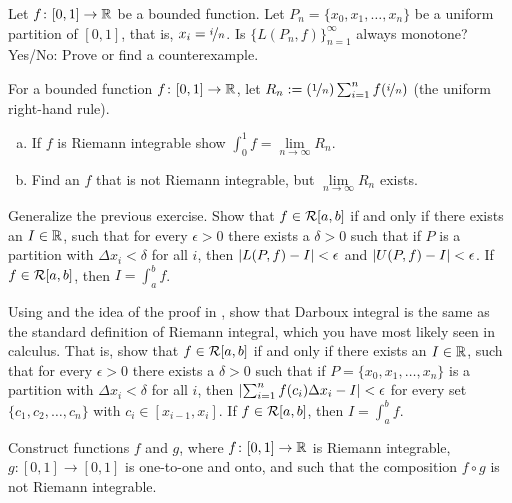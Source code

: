 \begin{exercise}
Let $f \colon [0,1] \to {\mathbb{R}}$ be a bounded function.
Let $P_n = \{ x_0,x_1,\ldots,x_n \}$ be a uniform partition of $[0,1]$,
that is, $x_i = \nicefrac{i}{n}$.  Is $\bigl\{ L(P_n,f) \bigr\}_{n=1}^\infty$
always monotone?  Yes/No: Prove or find a counterexample.
\end{exercise}

\begin{exercise}[Challenging]
For a bounded function $f \colon [0,1] \to {\mathbb{R}}$, let
$R_n := (\nicefrac{1}{n})\sum_{i=1}^n f(\nicefrac{i}{n})$ (the
uniform right-hand rule).
\begin{enumerate}[a)]
\item
If $f$ is Riemann integrable show $\int_0^1 f = \lim\limits_{n\to\infty} R_n$.
\item
Find an $f$ that is not Riemann integrable, but $\lim\limits_{n\to\infty} R_n$ exists.
\end{enumerate}
\end{exercise}

\begin{exercise}[Challenging] \label{exercise:riemannintdarboux}
Generalize the previous exercise.
Show that $f \in {\mathcal{R}}[a,b]$ if and only if there exists an $I \in {\mathbb{R}}$,
such that for every $\epsilon > 0$ there exists
a $\delta > 0$ such that if $P$ is a partition with $\Delta x_i < \delta$
for all $i$, then
$\left\lvert {L(P,f) - I} \right\rvert < \epsilon$ and
$\left\lvert {U(P,f) - I} \right\rvert < \epsilon$.  If $f \in {\mathcal{R}}[a,b]$, then $I = \int_a^b f$.
\end{exercise}

\begin{exercise}
Using  and the idea of
the proof in , show that 
Darboux integral is the same as the standard definition
of Riemann integral, which you have most likely seen in calculus.  That is,
show that
$f \in {\mathcal{R}}[a,b]$ if and only if there exists an $I \in {\mathbb{R}}$,
such that for every $\epsilon > 0$ there exists
a $\delta > 0$ such that if $P = \{ x_0,x_1,\ldots,x_n \}$
is a partition with $\Delta x_i < \delta$
for all $i$, then
$\left\lvert {\sum_{i=1}^n f(c_i) \Delta x_i - I} \right\rvert < \epsilon$ for every set
$\{ c_1,c_2,\ldots,c_n \}$ with $c_i \in [x_{i-1},x_i]$.
If $f \in {\mathcal{R}}[a,b]$, then $I = \int_a^b f$.
\end{exercise}


\begin{exercise}[Challenging]
Construct functions $f$ and $g$, 
where
$f \colon [0,1] \to {\mathbb{R}}$ is Riemann integrable,
$g \colon [0,1] \to [0,1]$ is one-to-one and onto,
and such that the composition $f \circ g$ is not Riemann integrable.
\end{exercise}

